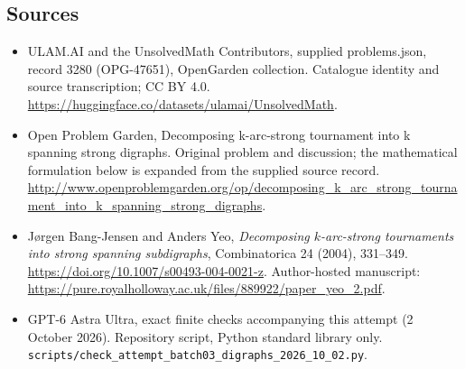 \documentclass[11pt,a4paper]{article}
\begin{document}
\subsection{Sources}
\begin{itemize}
\item[S1] ULAM.AI and the UnsolvedMath Contributors, supplied problems.json, record 3280 (OPG-47651), OpenGarden collection. Catalogue identity and source transcription; CC BY 4.0.
\url{https://huggingface.co/datasets/ulamai/UnsolvedMath}.
\item[S2] Open Problem Garden, Decomposing k-arc-strong tournament into k spanning strong digraphs. Original problem and discussion; the mathematical formulation below is expanded from the supplied source record.
\url{http://www.openproblemgarden.org/op/decomposing_k_arc_strong_tournament_into_k_spanning_strong_digraphs}.
\item[S3] J\o rgen Bang-Jensen and Anders Yeo, \emph{Decomposing $k$-arc-strong tournaments into strong spanning subdigraphs}, Combinatorica 24 (2004), 331--349. \url{https://doi.org/10.1007/s00493-004-0021-z}. Author-hosted manuscript: \url{https://pure.royalholloway.ac.uk/files/889922/paper_yeo_2.pdf}.
\item[S9] GPT-6 Astra Ultra, exact finite checks accompanying this attempt (2 October 2026). Repository script, Python standard library only. \texttt{scripts/check\_attempt\_batch03\_digraphs\_2026\_10\_02.py}.
\end{itemize}
\end{document}
